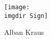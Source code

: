 \begin{flushright}
  \ifprinted
  \else
    \texttt{[image: \\imgdir Sign]}\par
  \fi
  Alban Kraus
\end{flushright}